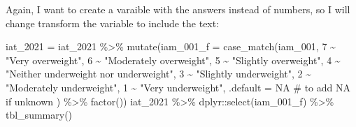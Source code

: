 \documentclass[
  letterpaper,
  DIV=11,
  numbers=noendperiod]{scrartcl}
\newenvironment{Shaded}{\begin{snugshade}}{\end{snugshade}}
\newcommand{\AttributeTok}[1]{\textcolor[rgb]{0.40,0.45,0.13}{#1}}
\newcommand{\CommentTok}[1]{\textcolor[rgb]{0.37,0.37,0.37}{#1}}
\newcommand{\ConstantTok}[1]{\textcolor[rgb]{0.56,0.35,0.01}{#1}}
\newcommand{\DecValTok}[1]{\textcolor[rgb]{0.68,0.00,0.00}{#1}}
\newcommand{\FunctionTok}[1]{\textcolor[rgb]{0.28,0.35,0.67}{#1}}
\newcommand{\NormalTok}[1]{\textcolor[rgb]{0.00,0.23,0.31}{#1}}
\newcommand{\OtherTok}[1]{\textcolor[rgb]{0.00,0.23,0.31}{#1}}
\newcommand{\SpecialCharTok}[1]{\textcolor[rgb]{0.37,0.37,0.37}{#1}}
\newcommand{\StringTok}[1]{\textcolor[rgb]{0.13,0.47,0.30}{#1}}
\begin{document}
\begin{tcolorbox}
Again, I want to create a varaible with the answers instead of numbers,
so I will change transform the variable to include the text:

\begin{Shaded}
\begin{Highlighting}[]
\NormalTok{iat\_2021 }\OtherTok{=}\NormalTok{ iat\_2021 }\SpecialCharTok{\%\textgreater{}\%}
  \FunctionTok{mutate}\NormalTok{(}\AttributeTok{iam\_001\_f =} \FunctionTok{case\_match}\NormalTok{(iam\_001,}
                             \DecValTok{7} \SpecialCharTok{\textasciitilde{}} \StringTok{"Very overweight"}\NormalTok{,}
                             \DecValTok{6} \SpecialCharTok{\textasciitilde{}} \StringTok{"Moderately overweight"}\NormalTok{,}
                             \DecValTok{5} \SpecialCharTok{\textasciitilde{}} \StringTok{"Slightly overweight"}\NormalTok{,}
                             \DecValTok{4} \SpecialCharTok{\textasciitilde{}} \StringTok{"Neither underweight nor underweight"}\NormalTok{,}
                             \DecValTok{3} \SpecialCharTok{\textasciitilde{}} \StringTok{"Slightly underweight"}\NormalTok{,}
                             \DecValTok{2} \SpecialCharTok{\textasciitilde{}} \StringTok{"Moderately underweight"}\NormalTok{,}
                             \DecValTok{1} \SpecialCharTok{\textasciitilde{}} \StringTok{"Very underweight"}\NormalTok{,}
                             \AttributeTok{.default =} \ConstantTok{NA} \CommentTok{\# to add NA if unknown}
\NormalTok{                             ) }\SpecialCharTok{\%\textgreater{}\%} \FunctionTok{factor}\NormalTok{())}
\NormalTok{iat\_2021 }\SpecialCharTok{\%\textgreater{}\%}
\NormalTok{  dplyr}\SpecialCharTok{::}\FunctionTok{select}\NormalTok{(iam\_001\_f) }\SpecialCharTok{\%\textgreater{}\%}
  \FunctionTok{tbl\_summary}\NormalTok{()}
\end{Highlighting}
\end{Shaded}


\end{tcolorbox}
\end{document}
